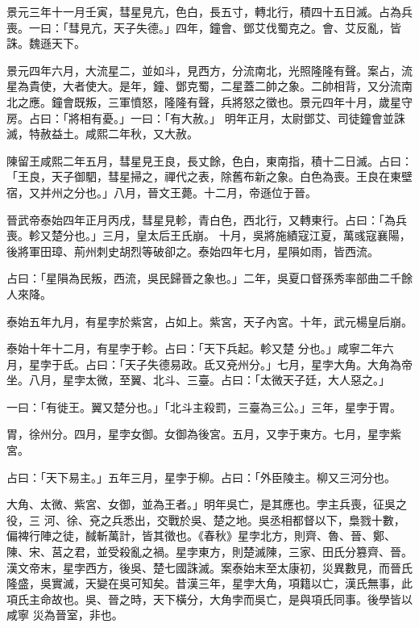 \begin{pinyinscope}
 景元三年十一月壬寅，彗星見亢，色白，長五寸，轉北行，積四十五日滅。占為兵喪。一曰：「彗見亢，天子失德。」四年，鐘會、鄧艾伐蜀克之。會、艾反亂，皆誅。魏遜天下。



 景元四年六月，大流星二，並如斗，見西方，分流南北，光照隆隆有聲。案占，流星為貴使，大者使大。是年，鐘、鄧克蜀，二星蓋二帥之象。二帥相背，又分流南北之應。鐘會既叛，三軍憤怒，隆隆有聲，兵將怒之徵也。景元四年十月，歲星守房。占曰：「將相有憂。」一曰：「有大赦。」
 明年正月，太尉鄧艾、司徒鐘會並誅滅，特赦益土。咸熙二年秋，又大赦。



 陳留王咸熙二年五月，彗星見王良，長丈餘，色白，東南指，積十二日滅。占曰：「王良，天子御駟，彗星掃之，禪代之表，除舊布新之象。白色為喪。王良在東壁宿，又并州之分也。」八月，晉文王薨。十二月，帝遜位于晉。



 晉武帝泰始四年正月丙戌，彗星見軫，青白色，西北行，又轉東行。占曰：「為兵喪。軫又楚分也。」三月，皇太后王氏崩。
 十月，吳將施績寇江夏，萬彧寇襄陽，後將軍田璋、荊州刺史胡烈等破卻之。泰始四年七月，星隕如雨，皆西流。



 占曰：「星隕為民叛，西流，吳民歸晉之象也。」二年，吳夏口督孫秀率部曲二千餘人來降。



 泰始五年九月，有星孛於紫宮，占如上。紫宮，天子內宮。十年，武元楊皇后崩。



 泰始十年十二月，有星孛于軫。占曰：「天下兵起。軫又楚
 分也。」咸寧二年六月，星孛于氐。占曰：「天子失德易政。氐又兗州分。」七月，星孛大角。大角為帝坐。八月，星孛太微，至翼、北斗、三臺。占曰：「太微天子廷，大人惡之。」



 一曰：「有徙王。翼又楚分也。」「北斗主殺罰，三臺為三公。」三年，星孛于胃。



 胃，徐州分。四月，星孛女御。女御為後宮。五月，又孛于東方。七月，星孛紫宮。



 占曰：「天下易主。」五年三月，星孛于柳。占曰：「外臣陵主。柳又三河分也。



 大角、太微、紫宮、女御，並為王者。」明年吳亡，是其應也。孛主兵喪，征吳之役，三
 河、徐、兗之兵悉出，交戰於吳、楚之地。吳丞相都督以下，梟戮十數，偏裨行陣之徒，馘斬萬計，皆其徵也。《春秋》星孛北方，則齊、魯、晉、鄭、陳、宋、莒之君，並受殺亂之禍。星孛東方，則楚滅陳，三家、田氏分篡齊、晉。漢文帝末，星孛西方，後吳、楚七國誅滅。案泰始末至太康初，災異數見，而晉氏隆盛，吳實滅，天變在吳可知矣。昔漢三年，星孛大角，項籍以亡，漢氏無事，此項氏主命故也。吳、晉之時，天下橫分，大角孛而吳亡，是與項氏同事。後學皆以咸寧
 災為晉室，非也。




\end{pinyinscope}
